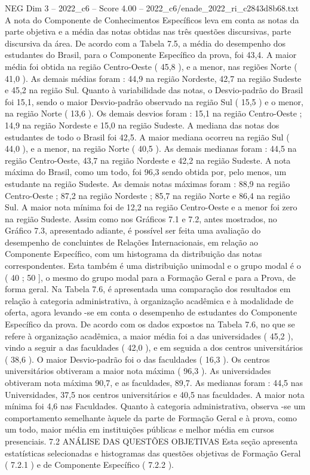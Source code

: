 \begin{textsample}{NEG Dim 3 – 2022\_c6 – Score 4.00 – 2022\_c6/enade\_2022\_ri\_c2843d8b68.txt}
A nota do Componente de Conhecimentos Específicos leva em conta as notas da parte objetiva e a média das notas obtidas nas três questões discursivas, parte discursiva da área.
De acordo com a Tabela 7.5, a média do desempenho dos estudantes do Brasil, para o Componente Específico da prova, foi 43,4.
A maior média foi obtida na região Centro-Oeste ( 45,8 ), e a menor, nas regiões Norte ( 41,0 ).
As demais médias foram : 44,9 na região Nordeste, 42,7 na região Sudeste e 45,2 na região Sul.
Quanto à variabilidade das notas, o Desvio-padrão do Brasil foi 15,1, sendo o maior Desvio-padrão observado na região Sul ( 15,5 ) e o menor, na região Norte ( 13,6 ).
Os demais desvios foram : 15,1 na região Centro-Oeste ; 14,9 na região Nordeste e 15,0 na região Sudeste.
A mediana das notas dos estudantes de todo o Brasil foi 42,5.
A maior mediana ocorreu na região Sul ( 44,0 ), e a menor, na região Norte ( 40,5 ).
As demais medianas foram : 44,5 na região Centro-Oeste, 43,7 na região Nordeste e 42,2 na região Sudeste.
A nota máxima do Brasil, como um todo, foi 96,3 sendo obtida por, pelo menos, um estudante na região Sudeste.
As demais notas máximas foram : 88,9 na região Centro-Oeste ; 87,2 na região Nordeste ; 85,7 na região Norte e 86,4 na região Sul.
A maior nota mínima foi de 12,2 na região Centro-Oeste e a menor foi zero na região Sudeste.
Assim como nos Gráficos 7.1 e 7.2, antes mostrados, no Gráfico 7.3, apresentado adiante, é possível ser feita uma avaliação do desempenho de concluintes de Relações Internacionais, em relação ao Componente Específico, com um histograma da distribuição das notas correspondentes.
Esta também é uma distribuição unimodal e o grupo modal é o ( 40 ; 50 ], o mesmo do grupo modal para a Formação Geral e para a Prova, de forma geral.
Na Tabela 7.6, é apresentada uma comparação dos resultados em relação à categoria administrativa, à organização acadêmica e à modalidade de oferta, agora levando -se em conta o desempenho de estudantes do Componente Específico da prova.
De acordo com os dados expostos na Tabela 7.6, no que se refere à organização acadêmica, a maior média foi a das universidades ( 45,2 ), vindo a seguir a das faculdades ( 42,0 ), e em seguida a dos centros universitários ( 38,6 ).
O maior Desvio-padrão foi o das faculdades ( 16,3 ).
Os centros universitários obtiveram a maior nota máxima ( 96,3 ).
As universidades obtiveram nota máxima 90,7, e as faculdades, 89,7.
As medianas foram : 44,5 nas Universidades, 37,5 nos centros universitários e 40,5 nas faculdades.
A maior nota mínima foi 4,6 nas Faculdades.
Quanto à categoria administrativa, observa -se um comportamento semelhante àquele da parte de Formação Geral e à prova, como um todo, maior média em instituições públicas e melhor média em cursos presenciais. 7.2 ANÁLISE DAS QUESTÕES OBJETIVAS Esta seção apresenta estatísticas selecionadas e histogramas das questões objetivas de Formação Geral ( 7.2.1 ) e de Componente Específico ( 7.2.2 ).

\end{textsample}
